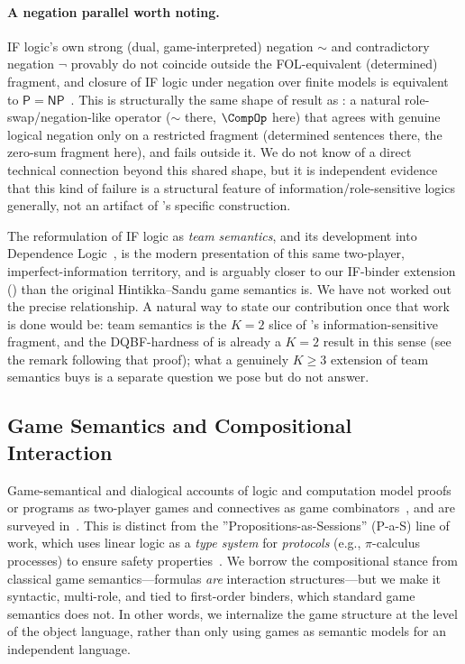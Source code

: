 \paragraph{A negation parallel worth noting.} IF logic's own strong (dual,
game-interpreted) negation $\sim$ and contradictory negation $\neg$
provably do not coincide outside the FOL-equivalent (determined) fragment,
and closure of IF logic under negation over finite models is equivalent to
$\mathsf P = \mathsf{NP}$~\cite{sep-logic-if}. This is structurally the same
shape of result as : a natural
role-swap/negation-like operator ($\sim$ there, $\CompOp$ here) that agrees
with genuine logical negation only on a restricted fragment (determined
sentences there, the zero-sum fragment here), and fails outside it. We do not
know of a direct technical connection beyond this shared shape, but it is
independent evidence that this kind of failure is a structural feature of
information/role-sensitive logics generally, not an artifact of \KFOL's
specific construction.

The reformulation of IF logic as \emph{team semantics}, and its development into Dependence Logic~\cite{Vaananen2007DependenceLogic}, is the modern presentation of this same two-player, imperfect-information territory, and is arguably closer to our IF-binder extension () than the original Hintikka--Sandu game semantics is. We have not worked out the precise relationship. A natural way to state our contribution once that work is done would be: team semantics is the $K=2$ slice of \KFOL's information-sensitive fragment, and the DQBF-hardness of  is already a $K=2$ result in this sense (see the remark following that proof); what a genuinely $K\ge 3$ extension of team semantics buys is a separate question we pose but do not answer.

\subsection{Game Semantics and Compositional Interaction}
Game-semantical and dialogical accounts of logic and computation model proofs or programs as two-player games and connectives as game combinators~\cite{Blass1992GameSemanticsLL,Girard1987LinearLogic,Lorenzen1960LogikUndAgon,van2003logic}, and are surveyed in~\cite{sep-games-abstraction}. This is distinct from the ''Propositions-as-Sessions'' (P-a-S) line of work, which uses linear logic as a \emph{type system} for \emph{protocols} (e.g., $\pi$-calculus processes) to ensure safety properties~\cite{wadler2012propositions,caires2010session}.
We borrow the compositional stance from classical game semantics---formulas \emph{are} interaction structures---but we make it syntactic, multi-role, and tied to first-order binders, which standard game semantics does not.
In other words, we internalize the game structure at the level of the object language, rather than only using games as semantic models for an independent language.

